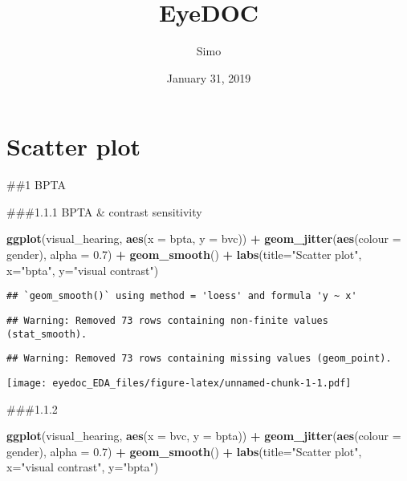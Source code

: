 \documentclass[]{article}
\title{EyeDOC}
\author{Simo}
\date{January 31, 2019}
\newenvironment{Shaded}{\begin{snugshade}}{\end{snugshade}}
\newcommand{\DataTypeTok}[1]{\textcolor[rgb]{0.13,0.29,0.53}{#1}}
\newcommand{\FloatTok}[1]{\textcolor[rgb]{0.00,0.00,0.81}{#1}}
\newcommand{\KeywordTok}[1]{\textcolor[rgb]{0.13,0.29,0.53}{\textbf{#1}}}
\newcommand{\NormalTok}[1]{#1}
\newcommand{\OperatorTok}[1]{\textcolor[rgb]{0.81,0.36,0.00}{\textbf{#1}}}
\newcommand{\StringTok}[1]{\textcolor[rgb]{0.31,0.60,0.02}{#1}}
\begin{document}
\maketitle

\hypertarget{scatter-plot}{%
\section{Scatter plot}\label{scatter-plot}}

\#\#1 BPTA

\#\#\#1.1.1 BPTA \& contrast sensitivity

\begin{Shaded}
\begin{Highlighting}[]
\KeywordTok{ggplot}\NormalTok{(visual_hearing, }\KeywordTok{aes}\NormalTok{(}\DataTypeTok{x =}\NormalTok{ bpta, }\DataTypeTok{y =}\NormalTok{ bvc)) }\OperatorTok{+}
\StringTok{    }\KeywordTok{geom_jitter}\NormalTok{(}\KeywordTok{aes}\NormalTok{(}\DataTypeTok{colour =}\NormalTok{ gender), }\DataTypeTok{alpha =} \FloatTok{0.7}\NormalTok{) }\OperatorTok{+}
\StringTok{    }\KeywordTok{geom_smooth}\NormalTok{() }\OperatorTok{+}
\StringTok{    }\KeywordTok{labs}\NormalTok{(}\DataTypeTok{title=}\StringTok{"Scatter plot"}\NormalTok{, }\DataTypeTok{x=}\StringTok{"bpta"}\NormalTok{, }\DataTypeTok{y=}\StringTok{"visual contrast"}\NormalTok{)}
\end{Highlighting}
\end{Shaded}

\begin{verbatim}
## `geom_smooth()` using method = 'loess' and formula 'y ~ x'
\end{verbatim}

\begin{verbatim}
## Warning: Removed 73 rows containing non-finite values (stat_smooth).
\end{verbatim}

\begin{verbatim}
## Warning: Removed 73 rows containing missing values (geom_point).
\end{verbatim}

\texttt{[image: eyedoc\_EDA\_files/figure-latex/unnamed-chunk-1-1.pdf]}

\#\#\#1.1.2

\begin{Shaded}
\begin{Highlighting}[]
\KeywordTok{ggplot}\NormalTok{(visual_hearing, }\KeywordTok{aes}\NormalTok{(}\DataTypeTok{x =}\NormalTok{ bvc, }\DataTypeTok{y =}\NormalTok{ bpta)) }\OperatorTok{+}
\StringTok{    }\KeywordTok{geom_jitter}\NormalTok{(}\KeywordTok{aes}\NormalTok{(}\DataTypeTok{colour =}\NormalTok{ gender), }\DataTypeTok{alpha =} \FloatTok{0.7}\NormalTok{) }\OperatorTok{+}
\StringTok{    }\KeywordTok{geom_smooth}\NormalTok{() }\OperatorTok{+}
\StringTok{    }\KeywordTok{labs}\NormalTok{(}\DataTypeTok{title=}\StringTok{"Scatter plot"}\NormalTok{, }\DataTypeTok{x=}\StringTok{"visual contrast"}\NormalTok{, }\DataTypeTok{y=}\StringTok{"bpta"}\NormalTok{)}
\end{Highlighting}
\end{Shaded}
\end{document}
